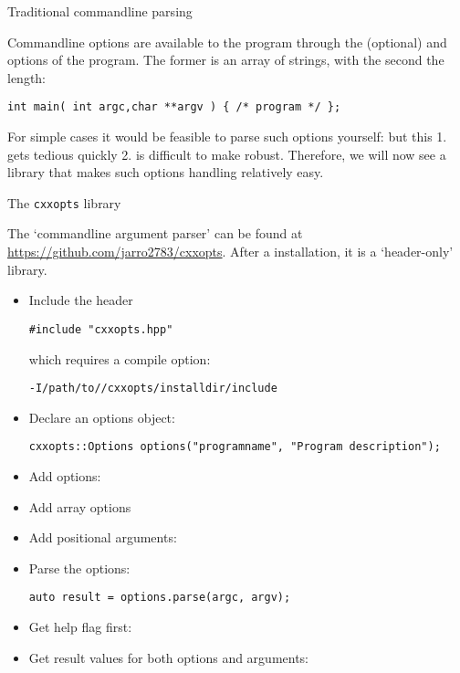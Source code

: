  {Traditional commandline parsing}

Commandline options are available to the program through the
(optional)
 and  options of the  program.
The former is an array of strings, with the second the length:
\begin{lstlisting}
int main( int argc,char **argv ) { /* program */ };
\end{lstlisting}

For simple cases it would be feasible to parse such options yourself:
but this 1. gets tedious quickly 2. is difficult to make robust.
Therefore, we will now see a library that makes such options handling
relatively easy.

 {The \texttt{cxxopts} library}

The  `commandline argument parser'
can be found at \url{https://github.com/jarro2783/cxxopts}.
After a  installation, it is a `header-only' library.

\begin{itemize}
\item Include the header
\begin{lstlisting}
#include "cxxopts.hpp"
\end{lstlisting}
which requires a compile option:
\begin{verbatim}
-I/path/to//cxxopts/installdir/include
\end{verbatim}
\item Declare an options object:
\begin{lstlisting}
cxxopts::Options options("programname", "Program description");
\end{lstlisting}

\item Add options:

\item Add array options

\item Add positional arguments:

\item Parse the options:
\begin{lstlisting}
auto result = options.parse(argc, argv);
\end{lstlisting}

\item Get help flag first:

\item Get result values
  for both options and arguments:
\end{itemize}

